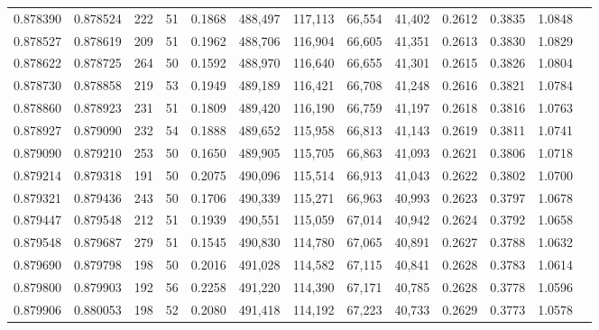 \begin{tabular}{rrrrrrrrrrrrr}
0.878390 & 0.878524 &   222 &  51 &                                     0.1868 & 488,497 & 117,113 &  66,554 &  41,402 & 0.2612 & 0.3835 & 1.0848 \\
0.878527 & 0.878619 &   209 &  51 &                                     0.1962 & 488,706 & 116,904 &  66,605 &  41,351 & 0.2613 & 0.3830 & 1.0829 \\
0.878622 & 0.878725 &   264 &  50 &                                     0.1592 & 488,970 & 116,640 &  66,655 &  41,301 & 0.2615 & 0.3826 & 1.0804 \\
0.878730 & 0.878858 &   219 &  53 &                                     0.1949 & 489,189 & 116,421 &  66,708 &  41,248 & 0.2616 & 0.3821 & 1.0784 \\
0.878860 & 0.878923 &   231 &  51 &                                     0.1809 & 489,420 & 116,190 &  66,759 &  41,197 & 0.2618 & 0.3816 & 1.0763 \\
0.878927 & 0.879090 &   232 &  54 &                                     0.1888 & 489,652 & 115,958 &  66,813 &  41,143 & 0.2619 & 0.3811 & 1.0741 \\
0.879090 & 0.879210 &   253 &  50 &                                     0.1650 & 489,905 & 115,705 &  66,863 &  41,093 & 0.2621 & 0.3806 & 1.0718 \\
0.879214 & 0.879318 &   191 &  50 &                                     0.2075 & 490,096 & 115,514 &  66,913 &  41,043 & 0.2622 & 0.3802 & 1.0700 \\
0.879321 & 0.879436 &   243 &  50 &                                     0.1706 & 490,339 & 115,271 &  66,963 &  40,993 & 0.2623 & 0.3797 & 1.0678 \\
0.879447 & 0.879548 &   212 &  51 &                                     0.1939 & 490,551 & 115,059 &  67,014 &  40,942 & 0.2624 & 0.3792 & 1.0658 \\
0.879548 & 0.879687 &   279 &  51 &                                     0.1545 & 490,830 & 114,780 &  67,065 &  40,891 & 0.2627 & 0.3788 & 1.0632 \\
0.879690 & 0.879798 &   198 &  50 &                                     0.2016 & 491,028 & 114,582 &  67,115 &  40,841 & 0.2628 & 0.3783 & 1.0614 \\
0.879800 & 0.879903 &   192 &  56 &                                     0.2258 & 491,220 & 114,390 &  67,171 &  40,785 & 0.2628 & 0.3778 & 1.0596 \\
0.879906 & 0.880053 &   198 &  52 &                                     0.2080 & 491,418 & 114,192 &  67,223 &  40,733 & 0.2629 & 0.3773 & 1.0578 \\

\end{tabular}
